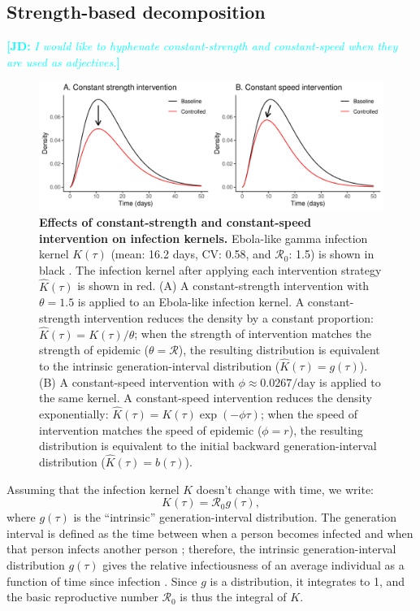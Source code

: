 \documentclass[12pt]{article}
\newcommand{\comment}[3]{\textcolor{#1}{\textbf{[#2: }\textit{#3}\textbf{]}}}
\newcommand{\jd}[1]{\comment{cyan}{JD}{#1}}
\newcommand{\RR}{\ensuremath{{\mathcal R}}}
\newcommand{\figlab}[1]{\label{fig:#1}}
\newcommand{\eqlab}[1]{\label{eq:#1}}
\begin{document}
\subsection{Strength-based decomposition}

\jd{I would like to hyphenate constant-strength and constant-speed when they are used as adjectives.}

\begin{figure}[!t]
\includegraphics[width=\textwidth]{../figure/constant_intervention.pdf}
\caption{
\textbf{Effects of constant-strength and constant-speed intervention on infection kernels.}
Ebola-like gamma infection kernel $K(\tau)$ (mean: 16.2 days, CV: 0.58, and $\RR_0$: 1.5) is shown in black \citep{park2019practical}.
The infection kernel after applying each intervention strategy $\hat K(\tau)$ is shown in red.
(A) A constant-strength intervention with $\theta = 1.5$ is applied to an Ebola-like infection kernel.
A constant-strength intervention reduces the density by a constant proportion: $\hat K(\tau) = K(\tau)/\theta$; when the strength of intervention matches the strength of epidemic ($\theta = \mathcal R$), the resulting distribution is equivalent to the intrinsic generation-interval distribution ($\hat K(\tau) = g(\tau)$).
(B) A constant-speed intervention with $\phi \approx 0.0267/\mathrm{day}$ is applied to the same kernel.
A constant-speed intervention reduces the density exponentially: $\hat K(\tau) = K(\tau) \exp(-\phi \tau)$; when the speed of intervention matches the speed of epidemic ($\phi = r$), the resulting distribution is equivalent to the initial backward generation-interval distribution ($\hat K(\tau) = b(\tau)$). 
}
\figlab{constant}
\end{figure}

Assuming that the infection kernel $K$ doesn't change with time, we write:
\begin{equation}
	K(\tau) = \RR_0 g(\tau),
	\eqlab{strengthFactors}
\end{equation}
where $g(\tau)$ is the ``intrinsic'' generation-interval distribution.
The generation interval is defined as the time between when a person becomes infected and when that person infects another person \citep{svensson2007note};
therefore, the intrinsic generation-interval distribution $g(\tau)$ gives the relative infectiousness of an average individual as a function of time since infection \citep{champredon2015intrinsic}. 
Since $g$ is a distribution, it integrates to 1, and the basic reproductive number $\RR_0$ is thus the integral of $K$.
\end{document}
